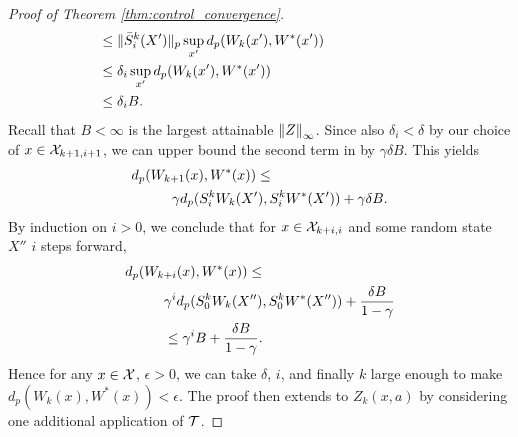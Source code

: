 \documentclass{article}
\begin{document}
\begin{proof}[Proof of Theorem \ref{thm:control_convergence}]
\begin{align*}
&\hspace{-7em} \le \pnorm{\bar S_i^k(X')} \sup_{x'} d_p(W_k(x'), W^*(x')) \\
&\hspace{-7em} \le \delta_i \sup_{x'} d_p(W_k(x'), W^*(x')) \\
&\hspace{-7em} \le \delta_i B .
\end{align*}
Recall that $B < \infty$ is the largest attainable $\left \| Z \right \|_{\infty}$. Since also $\delta_i < \delta$ by our choice of $x \in \mathcal{X}_{k+1, i+1}$, we can upper bound the second term in  by $\gamma \delta B$. This yields
\begin{align*}
d_p(W_{k+1}(x), W^*(x)) &\le \\
&\hspace{-6em} \gamma d_p(S^k_i W_k(X'), S^k_i W^*(X')) + \gamma \delta B .
\end{align*}
By induction on $i > 0$, we conclude that for $x \in \mathcal{X}_{k+i, i}$ and some random state $X''$ $i$ steps forward,
\begin{align*}
d_p(W_{k+i}(x), W^*(x)) &\le \\
&\hspace{-6em} \gamma^i d_p(S^k_0 W_k(X''), S^k_0 W^*(X'')) + \frac{\delta B}{1 - \gamma} \\
&\hspace{-6em} \le \gamma^i B + \frac{\delta B}{1 - \gamma} .
\end{align*}
Hence for any $x \in \mathcal{X}$, $\epsilon > 0$, we can take $\delta$, $i$, and finally $k$ large enough to make $d_p(W_k(x), W^*(x)) < \epsilon$. The proof then extends to $Z_k(x,a)$ by considering one additional application of $\mathcal{T}$.


\end{proof}
\end{document}
